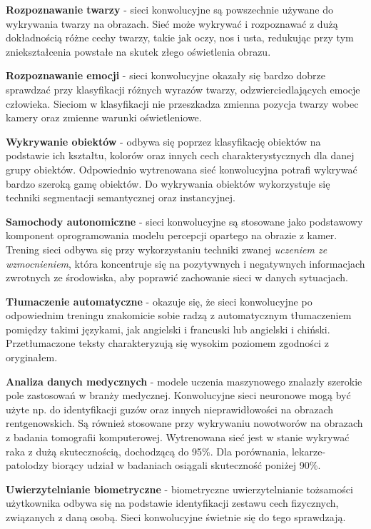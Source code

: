 \begin{enumerate*}
\item \textbf{Rozpoznawanie twarzy} - sieci konwolucyjne są powszechnie używane do wykrywania twarzy na obrazach. Sieć może wykrywać i rozpoznawać z dużą dokładnością różne cechy twarzy, takie jak oczy, nos i usta, redukując przy tym zniekształcenia powstałe na skutek złego oświetlenia obrazu.
\item \textbf{Rozpoznawanie emocji} - sieci konwolucyjne okazały się bardzo dobrze sprawdzać przy klasyfikacji różnych wyrazów twarzy, odzwierciedlających emocje człowieka. Sieciom w klasyfikacji nie przeszkadza zmienna pozycja twarzy wobec kamery oraz zmienne warunki oświetleniowe.
\item \textbf{Wykrywanie obiektów} - odbywa się poprzez klasyfikację obiektów na podstawie ich kształtu, kolorów oraz innych cech charakterystycznych dla danej grupy obiektów. Odpowiednio wytrenowana sieć konwolucyjna potrafi wykrywać bardzo szeroką gamę obiektów. Do wykrywania obiektów wykorzystuje się techniki segmentacji semantycznej oraz instancyjnej.
\item \textbf{Samochody autonomiczne} - sieci konwolucyjne są stosowane jako podstawowy komponent oprogramowania modelu percepcji opartego na obrazie z kamer. Trening sieci odbywa się przy wykorzystaniu techniki zwanej \textit{uczeniem ze wzmocnieniem}, która koncentruje się na pozytywnych i negatywnych informacjach zwrotnych ze środowiska, aby poprawić zachowanie sieci w danych sytuacjach.
\item \textbf{Tłumaczenie automatyczne} - okazuje się, że sieci konwolucyjne po odpowiednim treningu znakomicie sobie radzą z automatycznym tłumaczeniem pomiędzy takimi językami, jak angielski i francuski lub angielski i chiński. Przetłumaczone teksty charakteryzują się wysokim poziomem zgodności z oryginałem.
\item \textbf{Analiza danych medycznych} - modele uczenia maszynowego znalazły szerokie pole zastosowań w branży medycznej. Konwolucyjne sieci neuronowe mogą być użyte np. do identyfikacji guzów oraz innych nieprawidłowości na obrazach rentgenowskich. Są również stosowane przy wykrywaniu nowotworów na obrazach z badania tomografii komputerowej. Wytrenowana sieć jest w stanie wykrywać raka z dużą skutecznością, dochodzącą do 95\%. Dla porównania, lekarze-patolodzy biorący udział w badaniach osiągali skuteczność poniżej 90\%.
\item \textbf{Uwierzytelnianie biometryczne} - biometryczne uwierzytelnianie tożsamości użytkownika odbywa się na podstawie identyfikacji zestawu cech fizycznych, związanych z daną osobą. Sieci konwolucyjne świetnie się do tego sprawdzają. 

\end{enumerate*}
